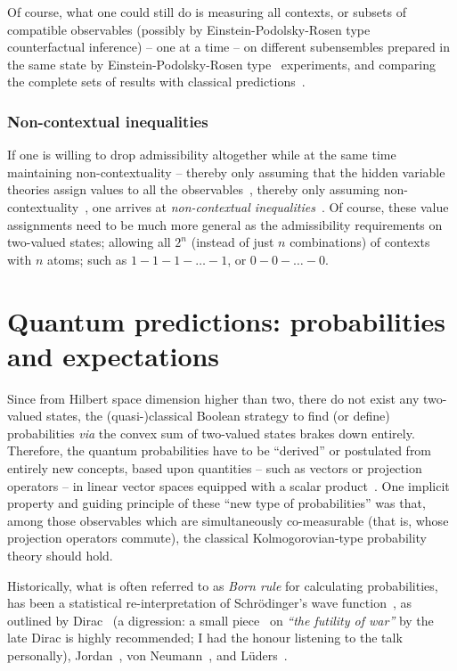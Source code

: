 Of course, what one could still do is measuring all contexts, or subsets of compatible observables
(possibly by Einstein-Podolsky-Rosen type~\cite{epr} counterfactual inference) -- one at a time --
 on different subensembles
prepared in the same state by Einstein-Podolsky-Rosen type~\cite{epr} experiments,
and comparing the complete sets of results
with classical predictions~\cite{ghz}.


\subsubsection{Non-contextual inequalities}

If one is willing to drop admissibility altogether while at the same time maintaining non-contextuality -- thereby only assuming
that the hidden variable theories assign
values to all the observables~\cite[Section~4, p.~375]{Bengtsson-2012},
thereby  only assuming non-contextuality~\cite{cabello:210401},
one arrives at {\em non-contextual inequalities}~\cite{cabello-2013-ncyclea}.
Of course, these value assignments need to be much more general as the admissibility requirements on
two-valued states; allowing all $2^n$ (instead of just $n$ combinations) of contexts with $n$ atoms;
such as $1-1-1- \ldots -1$, or $0-0-\ldots -0$.


\section{Quantum predictions: probabilities and expectations}

Since from Hilbert space dimension higher than two, there do not exist any two-valued states,
the (quasi-)classical Boolean strategy to find (or define) probabilities {\it via}
the convex sum of two-valued states brakes down entirely.
Therefore,
the quantum probabilities have to be ``derived'' or postulated from
entirely new concepts, based upon quantities -- such as vectors or projection operators --
in linear vector spaces equipped with a scalar product~\cite{Dirac621,dirac,Jordan1927,vonNeumann:1927:WAQ,v-neumann-49,v-neumann-55}.
One implicit property and guiding principle of these ``new type of probabilities''
was that, among those observables which are simultaneously co-measurable (that is, whose
projection operators commute), the classical Kolmogorovian-type probability theory should hold.

Historically, what is often referred to as
{\em Born rule}
for calculating probabilities,
has been a statistical re-interpretation of Schr\"odinger's
wave function~\cite[Footnote 1, Anmerkung bei der Korrektur, p.~865]{born-26-1},
as outlined by Dirac~\cite{Dirac621,dirac}
(a digression: a small piece~\cite{dirac-81} on {\em ``the futility of war''}
by the late Dirac is highly recommended; I had the honour listening to the talk personally), Jordan~\cite{Jordan1927},
von Neumann~\cite{vonNeumann:1927:WAQ,v-neumann-49,v-neumann-55}, and
L\"uders~\cite{Luders-1950,Luders-1950e,Busch2009}.

